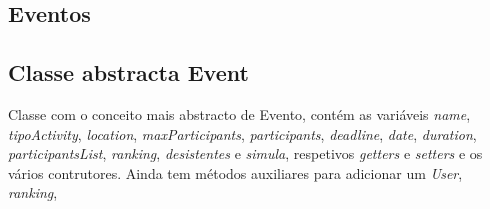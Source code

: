 \documentclass[10pt,notitlepage]{article}
\begin{document}
\subsection{Eventos}

\subsection{Classe abstracta Event}

Classe com o conceito mais abstracto de Evento, contém as variáveis \textit{name}, \textit{tipoActivity}, \textit{location}, \textit{maxParticipants}, \textit{participants}, \textit{deadline}, \textit{date}, \textit{duration}, \textit{participantsList}, \textit{ranking}, \textit{desistentes} e \textit{simula}, respetivos \textit{getters} e \textit{setters} e os vários contrutores. Ainda tem métodos auxiliares para adicionar um \textit{User}, \textit{ranking}, 


\subsection{}
\end{document}
